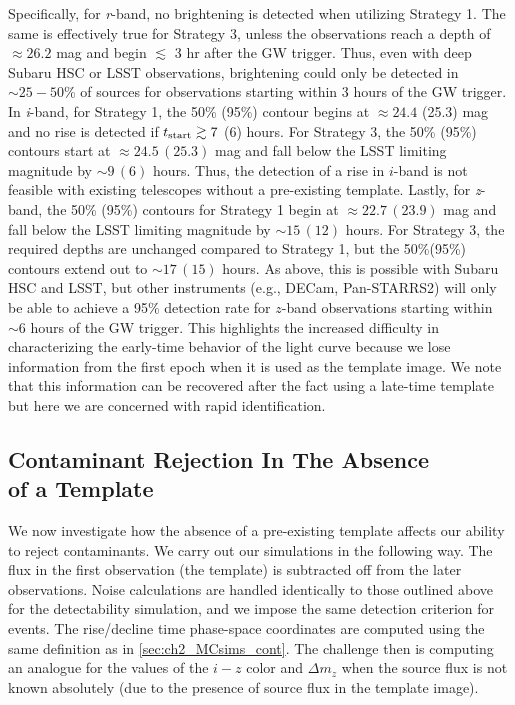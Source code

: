 Specifically, for {\em r}-band, no brightening is detected when utilizing Strategy 1. The same is effectively true for Strategy 3, unless the observations reach a depth of $\approx 26.2$ mag and begin $\lesssim$ 3 hr after the GW trigger. Thus, even with deep Subaru HSC or LSST observations, brightening could only be detected in $\sim25-50$\% of sources for observations starting within 3 hours of the GW trigger. In {\em i}-band, for Strategy 1, the 50\% (95\%) contour begins at $\approx 24.4$ (25.3) mag and no rise is detected if $t_{{\rm start}} \gtrsim 7$ (6) hours. For Strategy 3, the 50\% (95\%) contours start at $\approx 24.5\,(25.3)$ mag and fall below the LSST limiting magnitude by $\sim 9\,(6)$ hours. Thus, the detection of a rise in $i$-band is not feasible with existing telescopes without a pre-existing template. Lastly, for {\em z}-band, the 50\% (95\%) contours for Strategy 1 begin at $\approx 22.7\,(23.9)$ mag and fall below the LSST limiting magnitude by $\sim 15\,(12)$ hours. For Strategy 3, the required depths are unchanged compared to Strategy 1, but the 50\%(95\%) contours extend out to $\sim 17\,(15)$ hours. As above, this is possible with Subaru HSC and LSST, but other instruments (e.g., DECam, Pan-STARRS2) will only be able to achieve a 95\% detection rate for $z$-band observations starting within $\sim6$ hours of the GW trigger. This highlights the increased difficulty in characterizing the early-time behavior of the light curve because we lose information from the first epoch when it is used as the template image. We note that this information can be recovered after the fact using a late-time template but here we are concerned with rapid identification.

\subsection{Contaminant Rejection In The Absence\\ of a Template}
We now investigate how the absence of a pre-existing template affects our ability to reject contaminants. We carry out our simulations in the following way. The flux in the first observation (the template) is subtracted off from the later observations. Noise calculations are handled identically to those outlined above for the detectability simulation, and we impose the same detection criterion for events. The rise/decline time phase-space coordinates are computed using the same definition as in \cref{sec:ch2_MCsims_cont}. The challenge then is computing an analogue for the values of the $i-z$ color and $\Delta m_z$ when the source flux is not known absolutely (due to the presence of source flux in the template image). 

